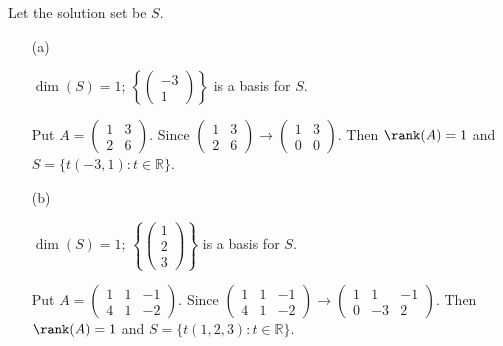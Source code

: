 \begin{Exercise}
Let the solution set be $S$.
\begin{enumerate}[(a)]
\item[(a)]
\begin{answer}
$\dim(S) = 1$; $\left\{\begin{pmatrix}
-3 \\
1
\end{pmatrix}\right\}$ is a basis for $S$.
\end{answer}
\begin{solution}
Put $A = \begin{pmatrix}
1 & 3 \\
2 & 6
\end{pmatrix}$. Since $\begin{pmatrix}
1 & 3 \\
2 & 6
\end{pmatrix} \longrightarrow \begin{pmatrix}
1 & 3 \\
0 & 0
\end{pmatrix}$. Then $\rank(A) = 1$ and $S=\{t(-3,1):t\in \mathbb{R}\}$.
\end{solution}

\item[(b)]
\begin{answer}
$\dim(S) = 1$; $\left\{\begin{pmatrix}
1 \\
2 \\
3
\end{pmatrix}\right\}$ is a basis for $S$.
\end{answer}
\begin{solution}
Put $A = \begin{pmatrix}
1 & 1 & -1 \\
4 & 1 & -2
\end{pmatrix}$. Since $\begin{pmatrix}
1 & 1 & -1 \\
4 & 1 & -2
\end{pmatrix} \longrightarrow \begin{pmatrix}
1 & 1 & -1 \\
0 & -3 & 2
\end{pmatrix}$. Then $\rank(A) = 1$ and $S=\{t(1,2,3):t\in \mathbb{R}\}$.
\end{solution}

\end{enumerate}
\end{Exercise}